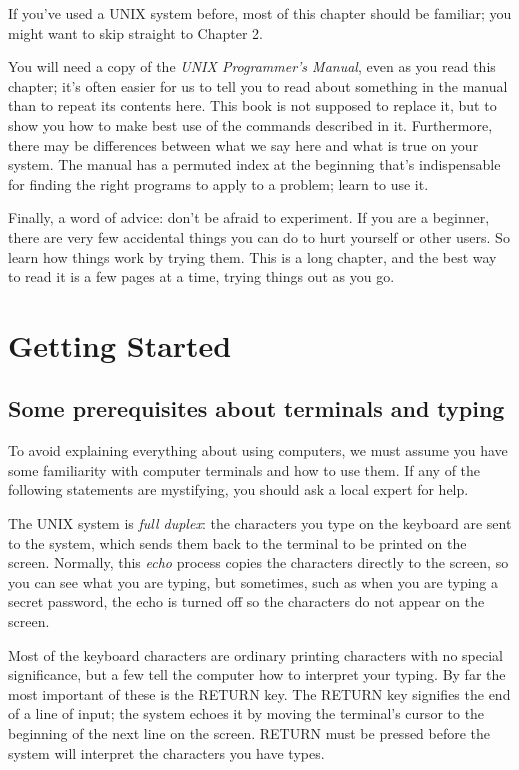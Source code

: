 If you've used a UNIX system before, most of this chapter should be familiar;
you might want to skip straight to Chapter 2.

You will need a copy of the \textit{UNIX Programmer's Manual}, even as you read
this chapter; it's often easier for us to tell you to read about something in
the manual than to repeat its contents here. This book is not supposed to
replace it, but to show you how to make best use of the commands described in
it. Furthermore, there may be differences between what we say here and what is
true on your system. The manual has a permuted index at the beginning that's
indispensable for finding the right programs to apply to a problem; learn to use
it.

Finally, a word of advice: don't be afraid to experiment. If you are a beginner,
there are very few accidental things you can do to hurt yourself or other
users. So learn how things work by trying them. This is a long chapter, and the
best way to read it is a few pages at a time, trying things out as you go.


\section{Getting Started}
\subsection{Some prerequisites about terminals and typing}

To avoid explaining everything about using computers, we must assume you have
some familiarity with computer terminals and how to use them. If any of the
following statements are mystifying, you should ask a local expert for help.

The UNIX system is \textit{full duplex}: the characters you type on the keyboard
are sent to the system, which sends them back to the terminal to be printed on
the screen. Normally, this \textit{echo} process copies the characters directly
to the screen, so you can see what you are typing, but sometimes, such as when
you are typing a secret password, the echo is turned off so the characters do
not appear on the screen.

Most of the keyboard characters are ordinary printing characters with no special
significance, but a few tell the computer how to interpret your typing. By far
the most important of these is the RETURN key. The RETURN key signifies the end
of a line of input; the system echoes it by moving the terminal's cursor to the
beginning of the next line on the screen. RETURN must be pressed before the
system will interpret the characters you have types.


